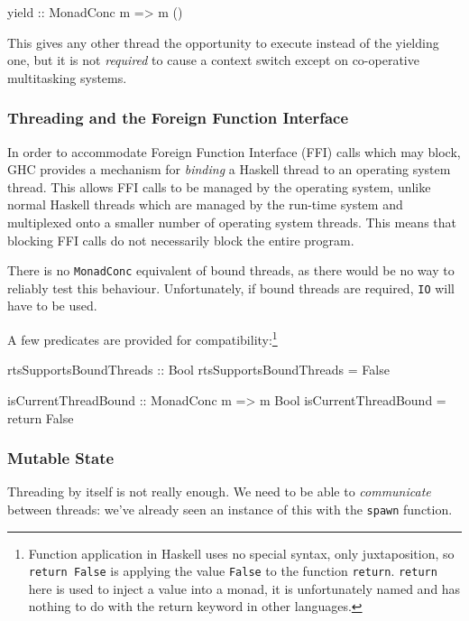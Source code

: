 \begin{haskellcode}
yield :: MonadConc m => m ()
\end{haskellcode}

This gives any other thread the opportunity to execute instead of the
yielding one, but it is not \emph{required} to cause a context switch
except on co-operative multitasking systems.

\subsubsection{Threading and the Foreign Function Interface}
\label{sec:abstraction-typeclass-ffithreads}

In order to accommodate Foreign Function Interface (FFI) calls which
may block, GHC provides a mechanism for \emph{binding} a Haskell
thread to an operating system thread. This allows FFI calls to be
managed by the operating system, unlike normal Haskell threads which
are managed by the run-time system and multiplexed onto a smaller
number of operating system threads. This means that blocking FFI calls
do not necessarily block the entire program.

There is no \verb|MonadConc| equivalent of bound threads, as there
would be no way to reliably test this behaviour. Unfortunately, if
bound threads are required, \verb|IO| will have to be used.

A few predicates are provided for compatibility:\footnote{Function
  application in Haskell uses no special syntax, only juxtaposition,
  so \texttt{return False} is applying the value \texttt{False} to the
  function \texttt{return}. \texttt{return} here is used to inject a
  value into a monad, it is unfortunately named and has nothing to do
  with the return keyword in other languages.}

\begin{haskellcode}
rtsSupportsBoundThreads :: Bool
rtsSupportsBoundThreads = False

isCurrentThreadBound :: MonadConc m => m Bool
isCurrentThreadBound = return False
\end{haskellcode}

\subsubsection{Mutable State}
\label{sec:abstraction-typeclass-crefs}

Threading by itself is not really enough. We need to be able to
\emph{communicate} between threads: we've already seen an instance
of this with the \verb|spawn| function.

